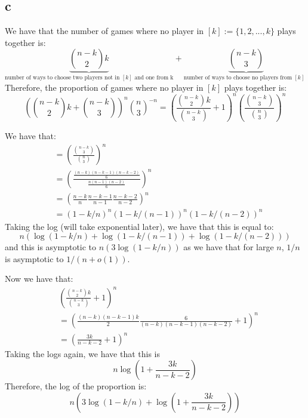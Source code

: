 \documentclass[]{article}
\theoremstyle{definition}
\numberwithin{theorem}{section}
\numberwithin{equation}{section}
\begin{document}
\subsection{c}
We have that the number of games where no player in $[k] := \lbrace 1, 2, ..., k \rbrace$ plays together is:
\begin{equation}
	\underbrace{\binom{n - k}{2} k}_{\text{number of ways to choose two players not in $[k]$ and one from k}} + \underbrace{\binom{n-k}{3}}_{\text{number of ways to choose no players from $[k]$ }}
\end{equation}
Therefore, the proportion of games where no player in $[k]$ plays together is:
\begin{equation}
	\left(\binom{n - k}{2} k + \binom{n-k}{3}\right)^n \binom{n}{3}^{-n} = \left(\frac{\binom{n-k}{2} k}{\binom{n-k}{3}} + 1\right)^n \left(\frac{\binom{n-k}{3}}{\binom{n}{3}}\right)^n
\end{equation}

We have that:
\begin{align*}
	&= \left(\frac{\binom{n-k}{3}}{\binom{n}{3}}\right)^n\\
	&= \left( \frac{\frac{(n-k)(n-k - 1)(n - k - 2)}{6}}{\frac{n(n-1)(n-2)}{6}}  \right)^n\\
	&= \left(\frac{n-k}{n} \frac{n-k - 1}{n - 1} \frac{n - k - 2}{n - 2}\right)^n\\
	&= \left(1 - k/n\right)^n \left(1 - k/(n - 1)\right)^n \left(1 - k/(n-2)\right)^n
\end{align*}
Taking the log (will take exponential later), we have that this is equal to:
\begin{equation}
	n \left( \log(1 - k/n) +  \log(1 - k/(n-1)) + \log(1 - k/(n-2)) \right)
\end{equation}
and this is asymptotic to 
$n \left(3 \log(1 - k/n)\right)$ as we have that for large $n$, $1/n$ is asymptotic to $1/(n + o(1))$.

Now we have that:
\begin{align*}
	&\left(\frac{\binom{n-k}{2} k}{\binom{n-k}{3}} + 1\right)^n\\
	&= \left(\frac{(n-k)(n - k - 1)k}{2} \frac{6}{(n - k)(n - k - 1)(n - k - 2)} + 1\right)^n\\
	&= \left(\frac{3k}{n - k - 2} + 1\right)^n
\end{align*}
Taking the logs again, we have that this is
\begin{equation}
	n \log(1 + \frac{3k}{n - k - 2})
\end{equation}
Therefore, the log of the proportion is:
\begin{equation}
	n \left( 3 \log(1 - k/n) + \log\left(1 + \frac{3k}{n - k - 2}\right)\right)
\end{equation}
\end{document}
